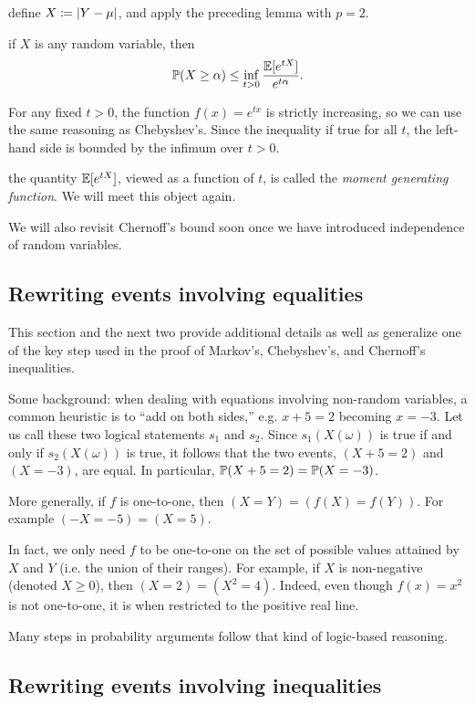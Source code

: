 \documentclass{article}
\begin{document}
 define $X \defeq |Y - \mu|$, and apply the preceding lemma with $p = 2$.

 if $X$ is any random variable, then
\[ \P(X \ge \alpha) \le \inf_{t>0} \frac{\E[e^{tX}]}{e^{t\alpha}}. \]

 For any fixed $t > 0$, the function $f(x) = e^{tx}$ is strictly increasing, so we can use the same reasoning as Chebyshev's. Since the inequality if true for all $t$, the left-hand side is bounded by the infimum over $t > 0$.

 the quantity $\E[e^{tX}]$, viewed as a function of $t$, is called the \emph{moment generating function}. We will meet this object again. 

We will also revisit Chernoff's bound soon once we have introduced independence of random variables. 


\subsection{Rewriting events involving equalities}\label{sec:rewriting-equalities}

This section and the next two provide additional details as well as generalize one of the key step used in the proof of Markov's, Chebyshev's, and Chernoff's inequalities.

Some background: when dealing with equations involving non-random variables, a common heuristic is to ``add on both sides,'' e.g. $x + 5 = 2$ becoming $x = -3$. Let us call these two logical statements $s_1$ and $s_2$. Since $s_1(X(\omega))$ is true if and only if  $s_2(X(\omega))$ is true, it follows that the two events, $(X + 5 = 2)$ and $(X = -3)$, are equal. In particular, $\P(X + 5 = 2) = \P(X = -3)$.

More generally, if $f$ is one-to-one, then $(X = Y) = (f(X) = f(Y))$. For example $(-X = -5) = (X = 5)$. 

In fact, we only need $f$ to be one-to-one on the set of possible values attained by $X$ and $Y$ (i.e. the union of their ranges). For example, if $X$ is non-negative (denoted $X \ge 0$), then $(X = 2) = (X^2 = 4)$. Indeed, even though $f(x) = x^2$ is not one-to-one, it is when restricted to the positive real line.

Many steps in probability arguments follow that kind of logic-based reasoning.


\subsection{Rewriting events involving inequalities}\label{sec:rewriting-inequalities}
\end{document}
